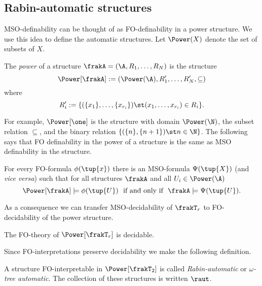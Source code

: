\subsection{Rabin-automatic structures}

MSO-definability can be thought of as FO-definability in a power structure. We use this idea to define the automatic structures.
Let $\Power(X)$ denote the set of subsets of $X$. 

\begin{definition} \label{AS:dfn:powerset} \cite{CoLo07}
The {\em power} of a structure $\frakA = ({\A},R_1,\dots,R_N)$ is the structure
\[
\Power[\frakA] := (\Power({\A}),{R'_1}, \dots,{R'_N}, \subseteq)
\]
where 
\[
 R'_i := \{ (\{x_1\},\dots,\{x_{r_i}\}) \st (x_1,\dots,x_{r_i}) \in R_i\}. 
\]
\end{definition}

For example, $\Power[\one]$ is the structure with domain $\Power(\N)$, the subset relation $\subseteq$, and the binary relation $\{(\{n\},\{n+1\}) \st n \in \N\}$.
The following says that FO definability in the power of a structure is the same as MSO definability in the structure.

\begin{proposition} \label{AS:prop:translation}
For every FO-formula $\phi(\tup{x})$ there is an MSO-formula $\Psi(\tup{X})$ (and {\it vice versa}) such that for all structures $\frakA$ and all $U_i \in \Power({\A})$
\[
\Power[\frakA] \models \phi(\tup{U}) \ \mbox{ if and only if } \  \frakA \models \Psi(\tup{U}) .
\]
\end{proposition}

As a consequence we can transfer MSO-decidability of $\frakT_r$ to FO-decidability of the power structure.
\begin{corollary}
The FO-theory of $\Power[\frakT_r]$ is decidable.
\end{corollary}

Since FO-interpretations preserve decidability we make the following definition.

\begin{definition} \label{AS:dfn:raut} \cite{Blum99} 
A structure FO-interpretable in $\Power[\frakT_2]$ is called 
{\em Rabin-automatic} or {\em $\omega$-tree automatic}. The collection of these structures is written $\raut$.
\end{definition}

